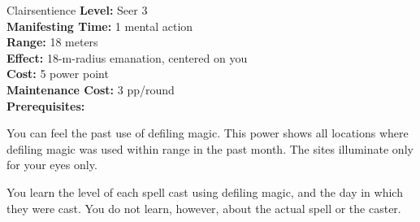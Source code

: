 {Clairsentience}
{
	\textbf{Level:}
	Seer 3\\
	\textbf{Manifesting Time:}
	1 mental action\\
	\textbf{Range:}
	18 meters\\
	\textbf{Effect:}
	18-m-radius emanation, centered on you\\
	\textbf{Cost:}
	5 power point\\
	\textbf{Maintenance Cost:}
	3 pp/round\\
	\textbf{Prerequisites:}
	\\
}
{
	You can feel the past use of defiling magic. This power shows all locations where defiling magic was used within range in the past month. The sites illuminate only for your eyes only.

	You learn the level of each spell cast using defiling magic, and the day in which they were cast. You do not learn, however, about the actual spell or the caster.
}
